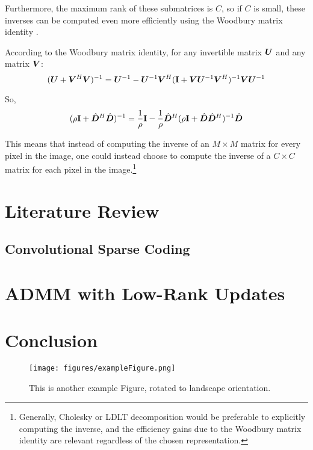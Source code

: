 Furthermore, the maximum rank of these submatrices is $C$, so if $C$ is small, these inverses can be computed even more efficiently using the Woodbury matrix identity \cite{vsorel2016fast} \cite{heide2015fast} \cite{wohlberg2015efficient}.

According to the Woodbury matrix identity, for any invertible matrix $\bm{U}$ and any matrix $\bm{V}$:
\begin{equation}
(\bm{U} + \bm{V}^H\bm{V})^{-1} = \bm{U}^{-1} - \bm{U}^{-1}\bm{V}^H({\bf I} + \bm{V}\bm{U}^{-1}\bm{V}^H)^{-1}\bm{V}\bm{U}^{-1}
\end{equation}

So,
\begin{equation}
(\rho{\bf I} + \hat{\bm{D}}^H\hat{\bm{D}})^{-1} = \frac{1}{\rho}{\bf I} - \frac{1}{\rho}\hat{\bm{D}}^H(\rho{\bf I} + \hat{\bm{D}}\hat{\bm{D}}^H)^{-1}\hat{\bm{D}}
\end{equation}

This means that instead of computing the inverse of an $M \times M$ matrix for every pixel in the image, one could instead choose to compute the inverse of a $C \times C$ matrix for each pixel in the image.\footnote{Generally, Cholesky or LDLT decomposition would be preferable to explicitly computing the inverse, and the efficiency gains due to the Woodbury matrix identity are relevant regardless of the chosen representation.}

\section{Literature Review}
\subsection{Convolutional Sparse Coding}
\section{ADMM with Low-Rank Updates}
\section{Conclusion}

\begin{sidewaysfigure}
\texttt{[image: figures/exampleFigure.png]}
\caption{This is another example Figure, rotated to landscape orientation.}
\label{LandscapeFigure}
\end{sidewaysfigure}
